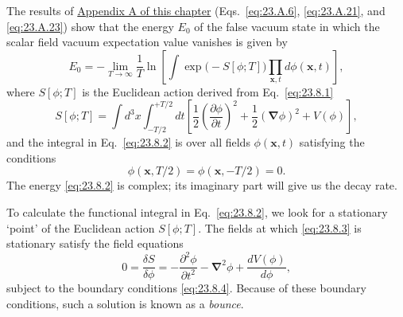 The results of \hyperref[app:23.A]{Appendix A of this chapter} (Eqs.~\eqref{eq:23.A.6}, \eqref{eq:23.A.21}, and \eqref{eq:23.A.23}) show that the energy $E_0$ of the false vacuum state in which the scalar field vacuum expectation value vanishes is given by
\begin{equation}
 E_0=-\lim_{T\to\infty}\frac{1}{T}\ln\left[
 \int\exp\bigl(-S[\phi;T]\bigr)
 \prod_{\mathbf x,t}d\phi(\mathbf x,t)
 \right],
 \tag{23.8.2}\label{eq:23.8.2}
\end{equation}
where $S[\phi;T]$ is the Euclidean action derived from Eq.~\eqref{eq:23.8.1}
\begin{equation}
 S[\phi;T]=\int d^3x\int_{-T/2}^{+T/2}dt
 \left[
 \frac{1}{2}\left(\frac{\partial\phi}{\partial t}\right)^2
 +\frac{1}{2}(\boldsymbol\nabla\phi)^2+V(\phi)
 \right],
 \tag{23.8.3}\label{eq:23.8.3}
\end{equation}
and the integral in Eq.~\eqref{eq:23.8.2} is over all fields $\phi(\mathbf x,t)$ satisfying the conditions
\begin{equation}
 \phi(\mathbf x,T/2)=\phi(\mathbf x,-T/2)=0.
 \tag{23.8.4}\label{eq:23.8.4}
\end{equation}
The energy \eqref{eq:23.8.2} is complex; its imaginary part will give us the decay rate.

To calculate the functional integral in Eq.~\eqref{eq:23.8.2}, we look for a stationary `point' of the Euclidean action $S[\phi;T]$. The fields at which \eqref{eq:23.8.3} is stationary satisfy the field equations
\begin{equation}
 0=\frac{\delta S}{\delta\phi}
 =-\frac{\partial^2\phi}{\partial t^2}
 -\boldsymbol\nabla^2\phi+\frac{dV(\phi)}{d\phi},
 \tag{23.8.5}\label{eq:23.8.5}
\end{equation}
subject to the boundary conditions \eqref{eq:23.8.4}. Because of these boundary conditions, such a solution is known as a \emph{bounce}.

